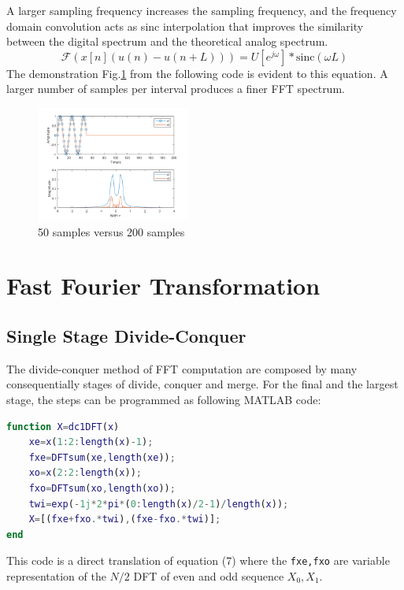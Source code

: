 \documentclass[conference]{IEEEtran}
\begin{document}
A larger sampling frequency increases the sampling frequency, and the frequency domain convolution acts as sinc interpolation that improves the similarity between the digital spectrum and the theoretical analog spectrum.
\begin{equation}
	\mathcal{F} (x[n](u(n)-u(n+L)))=U[e^{j\omega }]*\text{sinc}(\omega L)
\end{equation}
The demonstration Fig.\ref{fig:p522.png} from the following code is evident to this equation. A larger number of samples per interval produces a finer FFT spectrum.

\begin{figure}[htpb]
	\centering
	\includegraphics[width=0.45\textwidth]{p522.png}
	\caption{50 samples versus 200 samples}
	\label{fig:p522.png}
\end{figure}

\section{Fast Fourier Transformation}

\subsection{Single Stage Divide-Conquer}
The divide-conquer method of FFT computation are composed by many consequentially stages of divide, conquer and merge. For the final and the largest stage, the steps can be programmed as following MATLAB code:

\begin{lstlisting}[language=matlab,style=matlab]
function X=dc1DFT(x)
    xe=x(1:2:length(x)-1);
    fxe=DFTsum(xe,length(xe));
    xo=x(2:2:length(x));
    fxo=DFTsum(xo,length(xo));
    twi=exp(-1j*2*pi*(0:length(x)/2-1)/length(x));
    X=[(fxe+fxo.*twi),(fxe-fxo.*twi)];
end
\end{lstlisting}

This code is a direct translation of equation (7) where the \lstinline{fxe,fxo} are variable representation of the \( N/2 \)  DFT of even and odd sequence \( X_{0}, X_{1} \).
\end{document}
